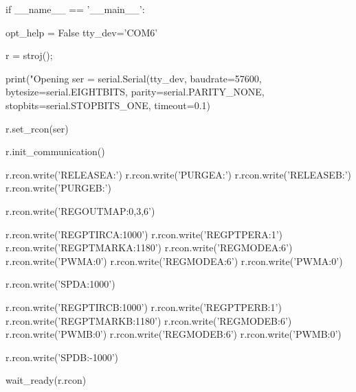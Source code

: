 if __name__ == '__main__':
 
  opt_help = False
  tty_dev='COM6'
  
  r = stroj();

  print("Opening %
  ser = serial.Serial(tty_dev,
      baudrate=57600,
      bytesize=serial.EIGHTBITS,
      parity=serial.PARITY_NONE,
      stopbits=serial.STOPBITS_ONE,
      timeout=0.1)

  r.set_rcon(ser)

  r.init_communication()

  r.rcon.write('RELEASEA:\n')
  r.rcon.write('PURGEA:\n')
  r.rcon.write('RELEASEB:\n')
  r.rcon.write('PURGEB:\n')

  r.rcon.write('REGOUTMAP:0,3,6\n')

  r.rcon.write('REGPTIRCA:1000\n')
  r.rcon.write('REGPTPERA:1\n')
  r.rcon.write('REGPTMARKA:1180\n')
  r.rcon.write('REGMODEA:6\n')
  r.rcon.write('PWMA:0\n')
  r.rcon.write('REGMODEA:6\n')
  r.rcon.write('PWMA:0\n')

  r.rcon.write('SPDA:1000\n')

  r.rcon.write('REGPTIRCB:1000\n')
  r.rcon.write('REGPTPERB:1\n')
  r.rcon.write('REGPTMARKB:1180\n')
  r.rcon.write('REGMODEB:6\n')
  r.rcon.write('PWMB:0\n')
  r.rcon.write('REGMODEB:6\n')
  r.rcon.write('PWMB:0\n')

  r.rcon.write('SPDB:-1000\n')

  wait_ready(r.rcon)
\endtt
